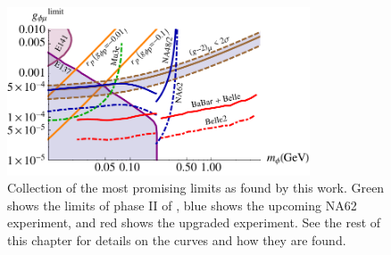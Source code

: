 \begin{figure}[h]
    \centering
    \includegraphics[width=0.8\textwidth]{Figures/limits/best_limits}
    \caption{Collection of the most promising limits as found by this work. Green shows the limits of phase II of \mueee, blue shows the upcoming NA62 experiment, and red shows the upgraded \belletwo experiment. See the rest of this chapter for details on the curves and how they are found.}
    \label{fig:best_limits}
\end{figure}




